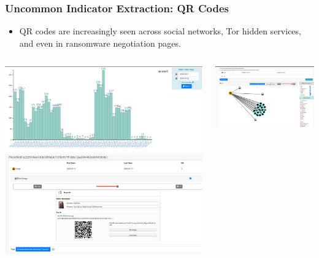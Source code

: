 \documentclass[10pt,aspectratio=169, colorlinks=true, linkcolor=circlBlue]{beamer}
\begin{document}
\begin{frame}
    \frametitle{Uncommon Indicator Extraction: QR Codes}
    \begin{itemize}
        \item QR codes are increasingly seen across social networks, Tor hidden services, and even in ransomware negotiation pages.
    \end{itemize}
    \begin{columns}
        \begin{column}{0.5\textwidth}
            \includegraphics[scale=0.15]{./img/qrcode-2.png}
	    \includegraphics[scale=0.10]{./img/qrcode-3.png}
        \end{column}
        \begin{column}{0.5\textwidth}
            \includegraphics[scale=0.1]{./img/qrcode.png}
        \end{column}
    \end{columns}
\end{frame}
\end{document}
